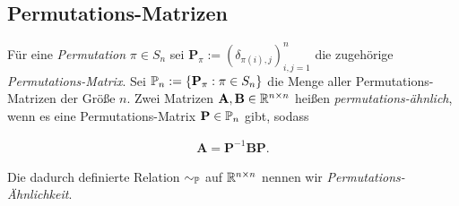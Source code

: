         \subsection{Permutations-Matrizen}

            \begin{definition}

                Für eine \textit{Permutation} $\pi \in S_n$ sei $\mathbf P_\pi := (\delta_{\pi(i), j})_{i, j = 1}^n$ die zugehörige \textit{Permutations-Matrix}.
                Sei $\P_n := \Bbraces{\mathbf P_\pi: \pi \in S_n}$ die Menge aller Permutations-Matrizen der Größe $n$.
                Zwei Matrizen $\mathbf A, \mathbf B \in \R^{n \times n}$ heißen \textit{permutations-ähnlich}, wenn es eine Permutations-Matrix $\mathbf P \in \P_n$ gibt, sodass

                \begin{align*}
                    \mathbf A = \mathbf P^{-1} \mathbf B \mathbf P.
                \end{align*}

                Die dadurch definierte Relation $\sim_{\P}$ auf $\R^{n \times n}$ nennen wir \textit{Permutations-Ähnlichkeit}.

            \end{definition}

